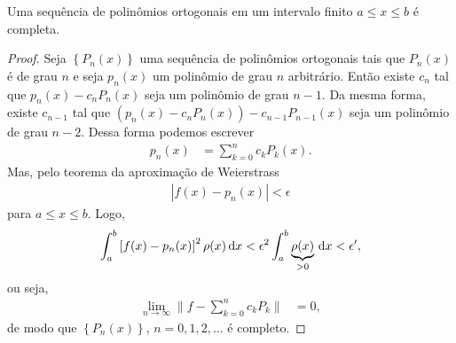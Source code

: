 \begin{teo}
    Uma sequência de polinômios ortogonais em um intervalo finito $a \leq x \leq b$ é completa.
\end{teo}
\begin{proof}
    Seja $\left\{ P_n(x) \right\}$ uma sequência de polinômios ortogonais tais que $P_n(x)$ é de grau $n$ e seja $p_n(x)$ um polinômio de grau $n$ arbitrário. Então existe $c_n$ tal que $p_n(x) - c_n P_n(x)$ seja um polinômio de grau $n - 1$. Da mesma forma, existe $c_{n - 1}$ tal que $\left( p_n(x) - c_n P_n(x) \right) - c_{n - 1} P_{n - 1}(x)$ seja um polinômio de grau $n - 2$. Dessa forma podemos escrever
    \begin{align*}
        p_n(x) &= \sum_{k = 0}^n c_k P_k(x).
    \end{align*}
    Mas, pelo teorema da aproximação de Weierstrass
    \begin{align*}
        | f(x) - p_n(x) | < \epsilon
    \end{align*}
    para $a \leq x \leq b$. Logo,
    \begin{align*}
        \int_a^b \left[ f(x) - p_n(x) \right]^2 \rho(x) \, \mathrm{d}x < \epsilon^2 \int_a^b \underbrace{\rho(x)}_{>0} \, \mathrm{d}x < \epsilon',
    \end{align*}
    ou seja,
    \begin{align*}
        \lim_{n \to \infty} \| f - \sum_{k = 0}^n c_k P_k \| &= 0,
    \end{align*}
    de modo que $\left\{ P_n(x) \right\}$, $n = 0, 1, 2, \ldots$ é completo.
\end{proof}

